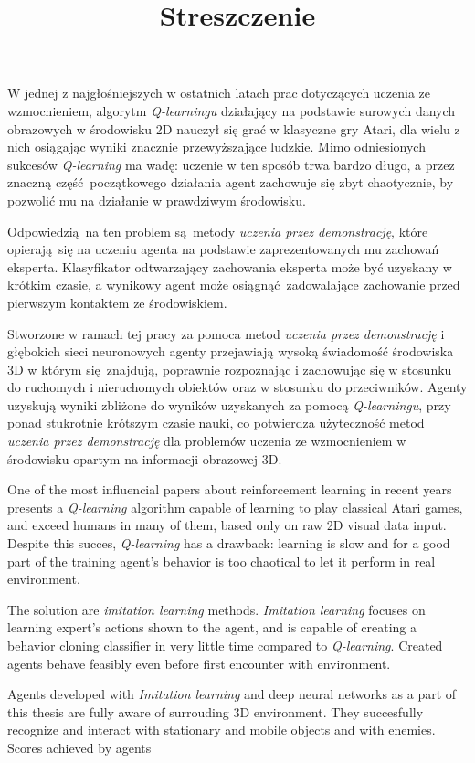\documentclass{article}
\begin{document}
\title{Streszczenie}
\maketitle
W jednej z najgłośniejszych w ostatnich latach prac dotyczących uczenia ze wzmocnieniem, algorytm \textit{Q-learningu} działający na podstawie surowych danych obrazowych w środowisku 2D nauczył się grać w klasyczne gry Atari, dla wielu z nich osiągając wyniki znacznie przewyższające ludzkie. Mimo odniesionych sukcesów \textit{Q-learning} ma wadę: uczenie w ten sposób trwa bardzo długo, a przez znaczną część początkowego działania agent zachowuje się zbyt chaotycznie, by pozwolić mu na działanie w prawdziwym środowisku.

Odpowiedzią na ten problem są metody \textit{uczenia przez demonstrację}, które opierają się na uczeniu agenta na podstawie zaprezentowanych mu zachowań eksperta. Klasyfikator odtwarzający zachowania eksperta może być uzyskany w krótkim czasie, a wynikowy agent może osiągnąć zadowalające zachowanie przed pierwszym kontaktem ze środowiskiem.

Stworzone w ramach tej pracy za pomoca metod \textit{uczenia przez demonstrację} i głębokich sieci neuronowych agenty przejawiają wysoką świadomość środowiska 3D w którym się znajdują, poprawnie rozpoznając i zachowując się w stosunku do ruchomych i nieruchomych obiektów oraz w stosunku do przeciwników. Agenty uzyskują wyniki zbliżone do wyników uzyskanych za pomocą \textit{Q-learningu}, przy ponad stukrotnie krótszym czasie nauki, co potwierdza użyteczność metod \textit{uczenia przez demonstrację} dla problemów uczenia ze wzmocnieniem w środowisku opartym na informacji obrazowej 3D.



One of the most influencial papers about reinforcement learning in recent years presents a \textit{Q-learning} algorithm capable of learning to play classical Atari games, and exceed humans in many of them, based only on raw 2D visual data input. Despite this succes, \textit{Q-learning} has a drawback: learning is slow and for a good part of the training agent's behavior is too chaotical to let it perform in real environment.

The solution are \textit{imitation learning} methods. \textit{Imitation learning} focuses on learning expert's actions shown to the agent, and is capable of creating a behavior cloning classifier in very little time compared to \textit{Q-learning}. Created agents behave feasibly even before first encounter with environment.

Agents developed with \textit{Imitation learning} and deep neural networks as a part of this thesis are fully aware of surrouding 3D environment. They succesfully recognize and interact with stationary and mobile objects and with enemies. Scores achieved by agents 
\end{document}
